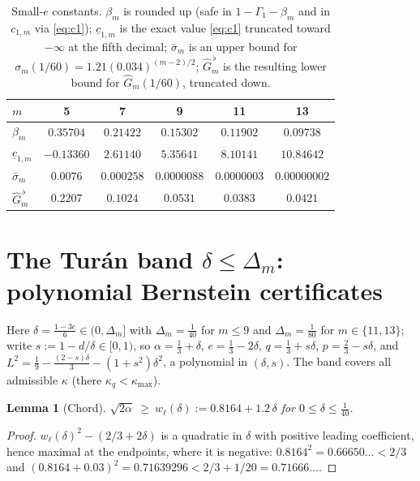 \documentclass[11pt]{amsart}
\newtheorem{lemma}[theorem]{Lemma}
\begin{document}
\begin{table}\centering
\begin{tabular}{lccccc}\toprule
$m$&5&7&9&11&13\\\midrule
$\beta_m$&$0.35704$&$0.21422$&$0.15302$&$0.11902$&$0.09738$\\
$\underline c_{1,m}$ &$-0.13360$&$2.61140$&$5.35641$&$8.10141$&$10.84642$\\
$\bar\sigma_m$&$0.0076$&$0.000258$&$0.0000088$&$0.0000003$&$0.00000002$\\
$\widehat G_m^{\,\flat}$&$0.2207$&$0.1024$&$0.0531$&$0.0383$&$0.0421$\\
\bottomrule
\end{tabular}
\caption{Small-$e$ constants.  $\beta_m$ is rounded up (safe in
$1-\Gamma_1-\beta_m$ and in $c_{1,m}$ via \eqref{eq:c1});
$\underline c_{1,m}$ is the exact value \eqref{eq:c1} truncated toward
$-\infty$ at the fifth decimal; $\bar\sigma_m$ is an upper bound for
$\sigma_m(1/60)=1.21(0.034)^{(m-2)/2}$; $\widehat G_m^{\,\flat}$ is the
resulting lower bound for $\widehat G_m(1/60)$, truncated down.}
\label{tab:smalle}
\end{table}

\section{The Tur\'an band $\delta\le\Delta_m$: polynomial Bernstein certificates}

Here $\delta=\frac{1-3e}6\in(0,\Delta_m]$ with
$\Delta_m=\tfrac1{40}$ for $m\le9$ and $\Delta_m=\tfrac1{80}$ for
$m\in\{11,13\}$; write $s:=1-d/\delta\in[0,1)$, so
$\alpha=\tfrac13+\delta$, $e=\tfrac13-2\delta$, $q=\tfrac13+s\delta$,
$p=\tfrac23-s\delta$, and
$L^2=\tfrac19-\tfrac{(2-s)\delta}3-(1+s^2)\delta^2$, a polynomial in
$(\delta,s)$.  The band covers all admissible $\kappa$ (there
$\kappa_q<\kappa_{\max}$).

\begin{lemma}[Chord]\label{lem:chord}
$\sqrt{2\alpha}\ \ge\ w_\ell(\delta):=0.8164+1.2\,\delta$ for
$0\le\delta\le\tfrac1{40}$.
\end{lemma}

\begin{proof}
$w_\ell(\delta)^2-(2/3+2\delta)$ is a quadratic in $\delta$ with positive
leading coefficient, hence maximal at the endpoints, where it is
negative: $0.8164^2=0.66650\ldots<2/3$ and
$(0.8164+0.03)^2=0.71639296<2/3+1/20=0.71666\ldots$.
\end{proof}
\end{document}

